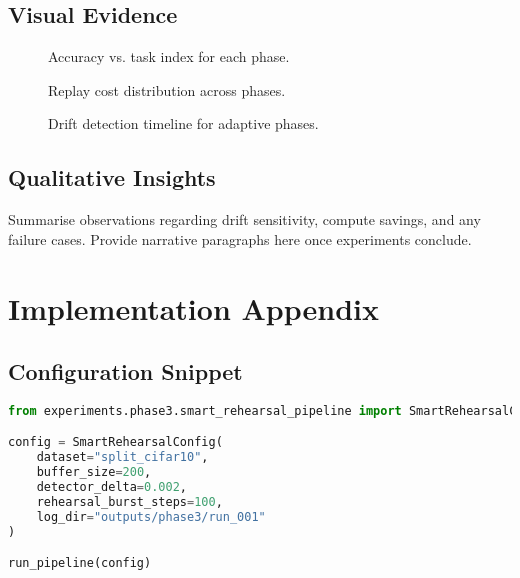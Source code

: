 \documentclass[12pt,a4paper]{article}
\begin{document}
\subsection{Visual Evidence}
\begin{figure}[H]
    \centering
    \caption{Accuracy vs. task index for each phase.}
    \label{fig:accuracy}
\end{figure}

\begin{figure}[H]
    \centering
    \caption{Replay cost distribution across phases.}
    \label{fig:replay}
\end{figure}

\begin{figure}[H]
    \centering
    \caption{Drift detection timeline for adaptive phases.}
    \label{fig:drift}
\end{figure}

\subsection{Qualitative Insights}
Summarise observations regarding drift sensitivity, compute savings, and any failure cases. Provide narrative paragraphs here once experiments conclude.

\section{Implementation Appendix}
\subsection{Configuration Snippet}
\begin{lstlisting}[language=Python, caption={Sample configuration invocation for Phase 3.}]
from experiments.phase3.smart_rehearsal_pipeline import SmartRehearsalConfig, run_pipeline

config = SmartRehearsalConfig(
    dataset="split_cifar10",
    buffer_size=200,
    detector_delta=0.002,
    rehearsal_burst_steps=100,
    log_dir="outputs/phase3/run_001"
)

run_pipeline(config)
\end{lstlisting}
\end{document}
